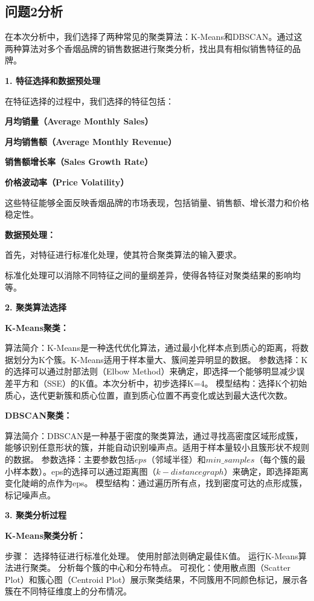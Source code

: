 \documentclass[a4paper]{article}
\begin{document}
\subsection{问题2分析}


在本次分析中，我们选择了两种常见的聚类算法：K-Means和DBSCAN。通过这两种算法对多个香烟品牌的销售数据进行聚类分析，找出具有相似销售特征的品牌。

\textbf{1. 特征选择和数据预处理}

在特征选择的过程中，我们选择的特征包括：

\textbf{月均销量（Average Monthly Sales）}

\textbf{月均销售额（Average Monthly Revenue）}

\textbf{销售额增长率（Sales Growth Rate）}

\textbf{价格波动率（Price Volatility）}

这些特征能够全面反映香烟品牌的市场表现，包括销量、销售额、增长潜力和价格稳定性。

\textbf{数据预处理：}

首先，对特征进行标准化处理，使其符合聚类算法的输入要求。

标准化处理可以消除不同特征之间的量纲差异，使得各特征对聚类结果的影响均等。

\textbf{2. 聚类算法选择}

\textbf{K-Means聚类：}

算法简介：K-Means是一种迭代优化算法，通过最小化样本点到质心的距离，将数据划分为K个簇。K-Means适用于样本量大、簇间差异明显的数据。
参数选择：K的选择可以通过肘部法则（Elbow Method）来确定，即选择一个能够明显减少误差平方和（SSE）的K值。本次分析中，初步选择K=4。
模型结构：选择K个初始质心，迭代更新簇和质心位置，直到质心位置不再变化或达到最大迭代次数。

\textbf{DBSCAN聚类：}

算法简介：DBSCAN是一种基于密度的聚类算法，通过寻找高密度区域形成簇，能够识别任意形状的簇，并能自动识别噪声点。适用于样本量较小且簇形状不规则的数据。
参数选择：主要参数包括$eps$（邻域半径）和$min\_samples$（每个簇的最小样本数）。eps的选择可以通过距离图$（k-distance graph）$来确定，即选择距离变化陡峭的点作为eps。
模型结构：通过遍历所有点，找到密度可达的点形成簇，标记噪声点。

\textbf{3. 聚类分析过程}

\textbf{K-Means聚类分析：}

步骤：
选择特征进行标准化处理。
使用肘部法则确定最佳K值。
运行K-Means算法进行聚类。
分析每个簇的中心和分布特点。
可视化：使用散点图（Scatter Plot）和簇心图（Centroid Plot）展示聚类结果，不同簇用不同颜色标记，展示各簇在不同特征维度上的分布情况。
\end{document}
